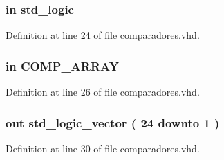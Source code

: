 \subsubsection[{clk}]{ {\bfseries \textcolor{keywordflow}{in}\textcolor{vhdlchar}{ }} {\bfseries \textcolor{comment}{std\+\_\+logic}\textcolor{vhdlchar}{ }} \hspace{0.3cm}{\ttfamily [Port]}}\label{classcomparadores_a4a4609c199d30b3adebbeb3a01276ec5}


Definition at line 24 of file comparadores.\+vhd.

\hypertarget{classcomparadores_ab73cec596619a058f732a10e71d5aada}{}
\subsubsection[{comp}]{ {\bfseries \textcolor{keywordflow}{in}\textcolor{vhdlchar}{ }} {\bfseries {\bfseries {\bf C\+O\+M\+P\+\_\+\+A\+R\+R\+A\+Y}} \textcolor{vhdlchar}{ }} \hspace{0.3cm}{\ttfamily [Port]}}\label{classcomparadores_ab73cec596619a058f732a10e71d5aada}


Definition at line 26 of file comparadores.\+vhd.

\hypertarget{classcomparadores_a8d13d6e22531ac75ac0b437c61c6eb4f}{}
\subsubsection[{comp\+\_\+out}]{ {\bfseries \textcolor{keywordflow}{out}\textcolor{vhdlchar}{ }} {\bfseries \textcolor{comment}{std\+\_\+logic\+\_\+vector}\textcolor{vhdlchar}{ }\textcolor{vhdlchar}{(}\textcolor{vhdlchar}{ }\textcolor{vhdlchar}{ } \textcolor{vhdldigit}{24} \textcolor{vhdlchar}{ }\textcolor{keywordflow}{downto}\textcolor{vhdlchar}{ }\textcolor{vhdlchar}{ } \textcolor{vhdldigit}{1} \textcolor{vhdlchar}{ }\textcolor{vhdlchar}{)}\textcolor{vhdlchar}{ }} \hspace{0.3cm}{\ttfamily [Port]}}\label{classcomparadores_a8d13d6e22531ac75ac0b437c61c6eb4f}


Definition at line 30 of file comparadores.\+vhd.

\hypertarget{classcomparadores_adcf9c6f5161d039addbda5819bee64a3}{}
